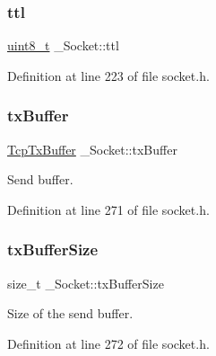 \mbox{\label{struct__Socket_a2992ae3236a8da34f54d98d1d6914256}} 
\subsubsection{\texorpdfstring{ttl}{ttl}}
{\footnotesize\ttfamily \hyperlink{stdint_8h_aba7bc1797add20fe3efdf37ced1182c5}{uint8\+\_\+t} \+\_\+\+Socket\+::ttl}



Definition at line 223 of file socket.\+h.

\mbox{\label{struct__Socket_aeebd69c2f369e17e13d23bbd620b71c9}} 
\subsubsection{\texorpdfstring{tx\+Buffer}{txBuffer}}
{\footnotesize\ttfamily \hyperlink{structTcpTxBuffer}{Tcp\+Tx\+Buffer} \+\_\+\+Socket\+::tx\+Buffer}



Send buffer. 



Definition at line 271 of file socket.\+h.

\mbox{\label{struct__Socket_a42c544e1021a6d8b0f270edcf40d7c51}} 
\subsubsection{\texorpdfstring{tx\+Buffer\+Size}{txBufferSize}}
{\footnotesize\ttfamily size\+\_\+t \+\_\+\+Socket\+::tx\+Buffer\+Size}



Size of the send buffer. 



Definition at line 272 of file socket.\+h.

\mbox{\label{struct__Socket_adc282596c6bd94ee739f5b67374b4761}} 
